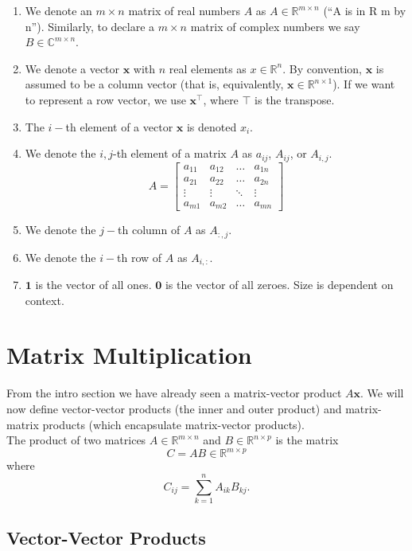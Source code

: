 \documentclass{article}
\newcommand{\1}{\mathbf{1}}
\newcommand{\0}{\mathbf{0}}
\newcommand{\xx}{\mathbf{x}}
\newcommand{\RR}{\mathbb{R}}
\newcommand{\CC}{\mathbb{C}}
\newcommand{\T}{\top}
\newcommand{\m}[1]{\begin{bmatrix} #1 \end{bmatrix}}
\begin{document}
\begin{enumerate}[-]
    \item We denote an $m\times n$ matrix of real numbers $A$ as $A\in\RR^{m\times n}$
        (``A is in R m by n'').
        Similarly, to declare a $m\times n$ matrix of complex numbers we say $B\in\CC^{m\times n}$.
    \item We denote a vector $\xx$ with $n$ real elements as $x\in\RR^n$. By convention, $\xx$
        is assumed to be a column vector (that is, equivalently, $\xx\in\RR^{n\times 1}$).
        If we want to represent a row vector, we use $\xx^\T$, where $\T$ is the transpose.
    \item The $i-$th element of a vector $\xx$ is denoted $x_i$.
    \item We denote the $i,j$-th element of a matrix $A$ as $a_{ij}$, $A_{ij}$, or
        $A_{i,j}$.
        \[
            A = \m{a_{11} & a_{12}&\dots&a_{1n} \\ a_{21} & a_{22} & \dots & a_{2n}\\ \vdots&\vdots&\ddots&\vdots\\a_{m1}&a_{m2}&\dots&a_{mn}}
        \]
    \item We denote the $j-$th column of $A$ as $A_{:,j}$.
    \item We denote the $i-$th row of $A$ as $A_{i,:}$.
    \item $\1$ is the vector of all ones. $\0$ is the vector of
        all zeroes. Size is dependent on context.
\end{enumerate}

\section{Matrix Multiplication}

From the intro section we have already seen a matrix-vector product $A\xx$. We will
now define vector-vector products (the inner and outer product) and matrix-matrix
products (which encapsulate matrix-vector products).\\

The product of two matrices $A\in\RR^{m\times n}$ and $B\in\RR^{n\times p}$ is
the matrix
\[
    C = AB\in\RR^{m\times p}
\]
where
\[
    C_{ij} = \sum_{k=1}^n A_{ik}B_{kj}.
\]

\subsection{Vector-Vector Products}
\end{document}
